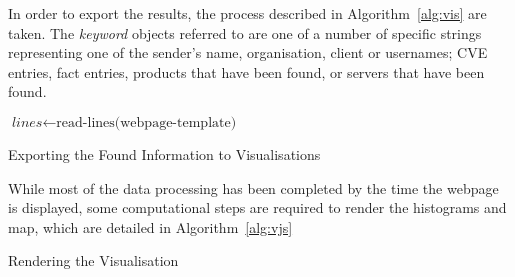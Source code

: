 In order to export the results, the process described in
Algorithm~\ref{alg:vis} are taken.  The \textit{keyword} objects referred to are
one of a number of specific strings representing one of the sender's name,
organisation, client or usernames; CVE entries, fact entries, products that
have been found, or servers that have been found.

\begin{algorithm}
	$\textit{lines}\gets\text{read-lines(webpage-template)}$\;
	\;
	\caption{Exporting the Found Information to Visualisations}
	\label{alg:vis}
\end{algorithm}

While most of the data processing has been completed by the time the webpage is 
displayed, some computational steps are required to render the histograms and
map, which are detailed in Algorithm~\ref{alg:vjs}

\begin{algorithm}

	\;
	\caption{Rendering the Visualisation}
	\label{alg:vjs}
\end{algorithm}
